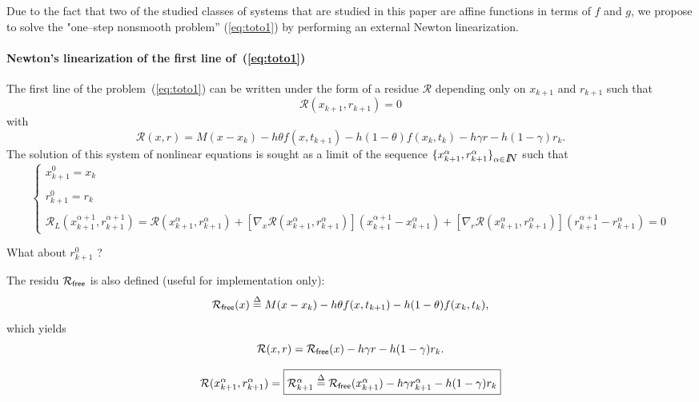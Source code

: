
Due to the fact that  two of the  studied classes of systems that are studied in this paper are affine functions in terms of $f$ and $g$, we propose to solve the "one--step nonsmooth problem'' (\ref{eq:toto1}) by performing an external Newton linearization.

 \paragraph{Newton's linearization of the first line of~(\ref{eq:toto1})} The first line of the  problem~(\ref{eq:toto1}) can be written under the form of a residue $\mathcal R$ depending only on $x_{k+1}$ and $r_{k+1}$ such that
\begin{equation}
  \label{eq:NL3}
  \mathcal R (x_{k+1},r _{k+1}) =0
\end{equation}
with
\begin{equation}
\mathcal R(x,r) = M(x - x_{k}) -h\theta f( x , t_{k+1}) - h(1-\theta)f(x_k,t_k) - h\gamma r
- h(1-\gamma)r_k.
\end{equation}
The solution of this system of nonlinear equations is sought as a limit of the sequence $\{ x^{\alpha}_{k+1},r^{\alpha}_{k+1} \}_{\alpha \in \mbox{\rm $I\!\!N$}}$ such that
 \begin{equation}
   \label{eq:NL7}
   \begin{cases}
     x^{0}_{k+1} = x_k \\ \\
     r^{0}_{k+1} = r_k \\ \\
     \mathcal R_L( x^{\alpha+1}_{k+1},r^{\alpha+1}_{k+1}) = \mathcal
     R(x^{\alpha}_{k+1},r^{\alpha}_{k+1})  + \left[ \nabla_{x} \mathcal
     R(x^{\alpha}_{k+1},r^{\alpha}_{k+1})\right] (x^{\alpha+1}_{k+1}-x^{\alpha}_{k+1} ) +
     \left[ \nabla_{r} \mathcal R(x^{\alpha}_{k+1},r^{\alpha}_{k+1})\right] (r^{\alpha+1}_{k+1} - r^{\alpha}_{k+1} ) =0
 \end{cases}
\end{equation}
\begin{ndrva}
  What about $r^0_{k+1}$ ?
\end{ndrva}

The residu \free $\mathcal R _{{\sf free}}$ is also defined (useful for implementation only):
\[\mathcal R _{{\sf free}}(x) \stackrel{\Delta}{=}  M(x - x_{k}) -h\theta f( x , t_{k+1}) - h(1-\theta)f(x_k,t_k),\]
which yields
\[\mathcal R (x,r) = \mathcal R _{{\sf free}}(x)   - h\gamma r - h(1-\gamma)r_k.\]

\begin{equation}
  \mathcal R (x^{\alpha}_{k+1},r^{\alpha}_{k+1}) = \fbox{$\mathcal R^{\alpha}_{k+1} \stackrel{\Delta}{=}  \mathcal R
_{{\sf free}}(x^{\alpha}_{k+1})  - h\gamma r^{\alpha}_{k+1} - h(1-\gamma)r_k$}\label{eq:rfree-1}
\end{equation}

